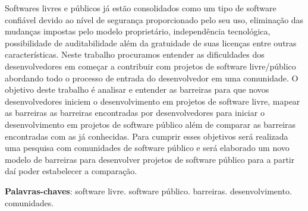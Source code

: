 \begin{resumo}
 
Softwares livres e públicos já estão consolidados como um tipo de software confiável 
devido ao nível de segurança proporcionado pelo seu uso, eliminação das mudanças
impostas pelo modelo proprietário, independência tecnológica, possibilidade de
auditabilidade além da gratuidade de suas licenças entre outras características.
%
Neste trabalho procuramos entender as dificuldades dos desenvolvedores em começar a 
contribuir com projetos de software livre/público abordando todo o processo de 
entrada do desenvolvedor em uma comunidade.
%
O objetivo deste trabalho é analisar e entender as barreiras para que novos desenvolvedores
iniciem o desenvolvimento em projetos de software livre, mapear as barreiras as barreiras
encontradas por desenvolvedores para iniciar o desenvolvimento em projetos de software
público além de comparar as barreiras encontradas com as já conhecidas. 
%
Para cumprir esses objetivos será realizada uma pesquisa com comunidades de software
público e será elaborado um novo modelo de barreiras para desenvolver projetos de 
software público para a partir daí poder estabelecer a comparação.
 \vspace{\onelineskip}
    
 \noindent
 \textbf{Palavras-chaves}: software livre. software público. barreiras. desenvolvimento. comunidades.
\end{resumo}

